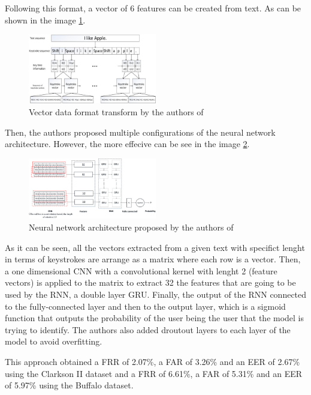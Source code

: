 Following this format, a vector of 6 features can be created from text. As can be shown in the image \ref{fig:deep_learning_vector_data_format}.

\begin{figure}[H]
	\centering
	\includegraphics[width=0.5\textwidth]{images/vectorization.jpg}
	\caption{Vector data format transform by the authors of \cite{deep_learning}}
	\label{fig:deep_learning_vector_data_format}
\end{figure}

Then, the authors proposed multiple configurations of the neural network architecture. However, the more effecive can be see in the image \ref{fig:deep_learning_architecture}.

\begin{figure}[H]
	\centering
	\includegraphics[width=0.5\textwidth]{images/architecture.jpg}
	\caption{Neural network architecture proposed by the authors of \cite{deep_learning}}
	\label{fig:deep_learning_architecture}
\end{figure}

As it can be seen, all the vectors extracted from a given text with specifict lenght in terms of keystrokes are arrange as a matrix where each row is a vector. Then, a one dimensional CNN with a convolutional kernel with lenght 2 (feature vectors) is applied to the matrix to extract 32 the features that are going to be used by the RNN, a double layer GRU. Finally, the output of the RNN connected to the fully-connected layer and then to the output layer, which is a sigmoid function that outputs the probability of the user being the user that the model is trying to identify. The authors also added droutout layers to each layer of the model to avoid overfitting.

This approach obtained a FRR of 2.07\%, a FAR of 3.26\% and an EER of 2.67\% using the Clarkson II dataset and a FRR of 6.61\%, a FAR of 5.31\% and an EER of 5.97\% using the Buffalo dataset.